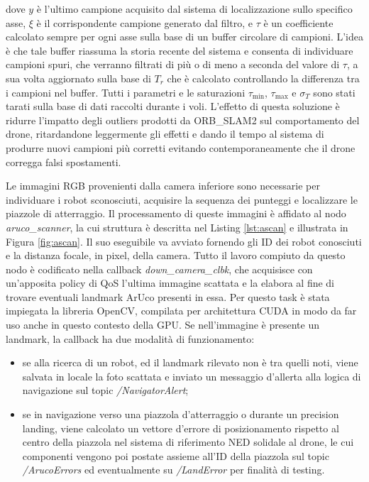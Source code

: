 dove $y$ è l'ultimo campione acquisito dal sistema di localizzazione sullo specifico asse, $\xi$ è il corrispondente campione generato dal filtro, e $\tau$ è un coefficiente calcolato sempre per ogni asse sulla base di un buffer circolare di campioni. L'idea è che tale buffer riassuma la storia recente del sistema e consenta di individuare campioni spuri, che verranno filtrati di più o di meno a seconda del valore di $\tau$, a sua volta aggiornato sulla base di $T_r$ che è calcolato controllando la differenza tra i campioni nel buffer. Tutti i parametri e le saturazioni $\tau_{\min}$, $\tau_{\max}$ e $\sigma_T$ sono stati tarati sulla base di dati raccolti durante i voli. L'effetto di questa soluzione è ridurre l'impatto degli outliers prodotti da ORB\_SLAM2 sul comportamento del drone, ritardandone leggermente gli effetti e dando il tempo al sistema di produrre nuovi campioni più corretti evitando contemporaneamente che il drone corregga falsi spostamenti.

\indent Le immagini RGB provenienti dalla camera inferiore sono necessarie per individuare i robot sconosciuti, acquisire la sequenza dei punteggi e localizzare le piazzole di atterraggio. Il processamento di queste immagini è affidato al nodo \emph{aruco\_scanner}, la cui struttura è descritta nel Listing \ref{lst:ascan} e illustrata in Figura \ref{fig:ascan}. Il suo eseguibile va avviato fornendo gli ID dei robot conosciuti e la distanza focale, in pixel, della camera. Tutto il lavoro compiuto da questo nodo è codificato nella callback \emph{down\_camera\_clbk}, che acquisisce con un'apposita policy di QoS l'ultima immagine scattata e la elabora al fine di trovare eventuali landmark ArUco presenti in essa. Per questo task è stata impiegata la libreria OpenCV, compilata per architettura CUDA in modo da far uso anche in questo contesto della GPU. Se nell'immagine è presente un landmark, la callback ha due modalità di funzionamento:
\begin{itemize}
    \item se alla ricerca di un robot, ed il landmark rilevato non è tra quelli noti, viene salvata in locale la foto scattata e inviato un messaggio d'allerta alla logica di navigazione sul topic \emph{/NavigatorAlert};
    \item se in navigazione verso una piazzola d'atterraggio o durante un precision landing, viene calcolato un vettore d'errore di posizionamento rispetto al centro della piazzola nel sistema di riferimento NED solidale al drone, le cui componenti vengono poi postate assieme all'ID della piazzola sul topic \emph{/ArucoErrors} ed eventualmente su \emph{/LandError} per finalità di testing.
\end{itemize}

